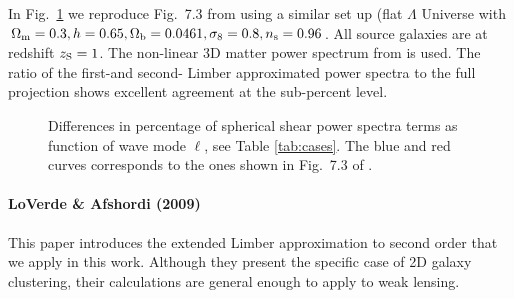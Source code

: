 \documentclass[fleqn,usenatbib]{mnras} %
\begin{document}
\begin{appendix}
In Fig.~\ref{fig:L1L2E_Rijt} we reproduce Fig.~7.3 from \cite{vande2012} using
a similar set up (flat $\Lambda$ Universe with $\Omega_{\rm m} = 0.3, h=0.65,
\Omega_{\rm b} = 0.0461, \sigma_8 = 0.8, n_{\rm s} = 0.96$. All source galaxies
are at redshift $z_{\rm S} = 1$. The non-linear 3D matter power spectrum from
\cite{2012ApJ...761..152T} is used. The ratio of the first-and second- Limber approximated
power spectra to the full
projection shows excellent agreement at the sub-percent level.

\begin{figure}

  \begin{center}
  \end{center}

    \caption{Differences in percentage of spherical shear power spectra terms
    as function of wave mode $\ell$, see Table \ref{tab:cases}.
    The blue and red curves corresponds to the ones shown in Fig.~7.3 of \citet{vande2012}.
    }

    \label{fig:L1L2E_Rijt}

\end{figure}



\paragraph{LoVerde \& Afshordi (2009)}

This paper introduces the extended Limber approximation to second order that we
apply in this work. Although they present the specific case of 2D galaxy
clustering, their calculations are general enough to apply to weak lensing.


\end{appendix}
\end{document}
